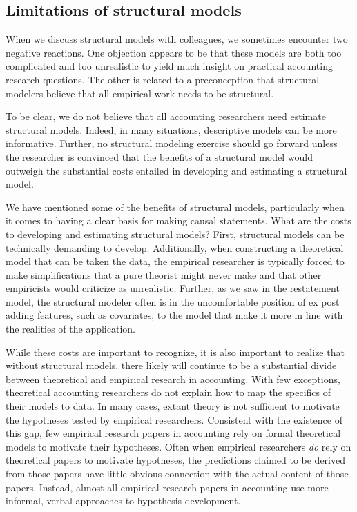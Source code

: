 \documentclass[12pt,reqno,titlepage]{amsart}
\theoremstyle{definition}
\begin{document}
\begin{doublespace}
\subsection{Limitations of structural models}

When we discuss structural models with colleagues, we sometimes encounter two negative reactions.
One objection appears to be that these models are both too complicated and too unrealistic to yield much insight on practical accounting research questions.
The other is related to a preconception that structural modelers believe that all empirical work needs to be structural.

To be clear, we do not believe that all accounting researchers need estimate structural models. 
Indeed, in many situations, descriptive models can be more informative.
Further, no structural modeling exercise should go forward unless the researcher is convinced that the benefits of a structural model would outweigh the substantial costs entailed in developing and estimating a structural model.

We have mentioned some of the benefits of structural models, particularly when it comes to having a clear basis for making causal statements.
What are the costs to developing and estimating structural models? 
First, structural models can be technically demanding to develop. 
Additionally, when constructing a theoretical model that can be taken the data, the empirical researcher is typically forced to make simplifications that a pure theorist might never make and that other empiricists would criticize as unrealistic.
Further, as we saw in the restatement model, the structural modeler often is in the uncomfortable position of ex post adding features, such as covariates, to the model that make it more in line with the realities of the application.

While these costs are important to recognize, it is also important to realize that without structural models, there likely will continue to be a substantial divide between theoretical and empirical research in accounting.
With few exceptions, theoretical accounting researchers do not explain how to map the specifics of their models to data. 
In many cases, extant theory is not sufficient to motivate the hypotheses tested by empirical researchers.
Consistent with the existence of this gap, few empirical research papers in accounting rely on formal theoretical models to motivate their hypotheses. 
Often when empirical researchers \emph{do} rely on theoretical papers to motivate hypotheses, the predictions claimed to be derived from those papers have little obvious connection with the actual content of those papers.
Instead, almost all empirical research papers in accounting use more informal, verbal approaches to hypothesis development.


\end{doublespace}
\end{document}
